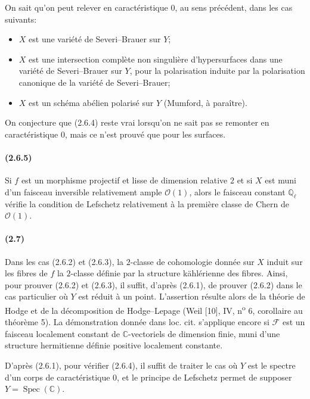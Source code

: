 \documentclass[10pt]{article}
\providecommand{\C}{\mathbb C}
\providecommand{\Ql}{\mathbb Q_\ell}
\providecommand{\Spec}{\operatorname{Spec}}
\begin{document}
On sait qu'on peut relever en caractéristique $0$, au sens précédent, dans les cas suivants:
\begin{itemize}
\item $X$ est une variété de Severi--Brauer sur $Y$;
\item $X$ est une intersection complète non singulière d'hypersurfaces dans une variété de Severi--Brauer sur $Y$, pour la polarisation induite par la polarisation canonique de la variété de Severi--Brauer;
\item $X$ est un schéma abélien polarisé sur $Y$ (Mumford, à paraître).
\end{itemize}
On conjecture que (2.6.4) reste vrai lorsqu'on ne sait pas se remonter en caractéristique $0$, mais ce n'est prouvé que pour les surfaces.

\paragraph{(2.6.5)} Si $f$ est un morphisme projectif et lisse de dimension relative $2$ et si $X$ est muni d'un faisceau inversible relativement ample $\mathcal O(1)$, alors le faisceau constant $\Ql$ vérifie la condition de Lefschetz relativement à la première classe de Chern de $\mathcal O(1)$.

\paragraph{(2.7)} Dans les cas (2.6.2) et (2.6.3), la $2$-classe de cohomologie donnée sur $X$ induit sur les fibres de $f$ la $2$-classe définie par la structure kählérienne des fibres. Ainsi, pour prouver (2.6.2) et (2.6.3), il suffit, d'après (2.6.1), de prouver (2.6.2) dans le cas particulier où $Y$ est réduit à un point. L'assertion résulte alors de la théorie de Hodge et de la décomposition de Hodge--Lepage (Weil [10], IV, n\textsuperscript{o} 6, corollaire au théorème 5). La démonstration donnée dans loc. cit. s'applique encore si $\mathcal F$ est un faisceau localement constant de $\C$-vectoriels de dimension finie, muni d'une structure hermitienne définie positive localement constante.

D'après (2.6.1), pour vérifier (2.6.4), il suffit de traiter le cas où $Y$ est le spectre d'un corps de caractéristique $0$, et le principe de Lefschetz permet de supposer $Y=\Spec(\C)$.
\end{document}
